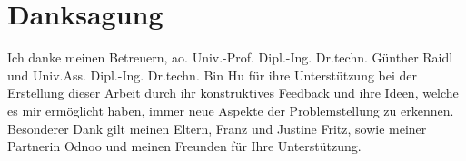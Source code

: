 \chapter*{Danksagung}

Ich danke meinen Betreuern, ao. Univ.-Prof. Dipl.-Ing. Dr.techn. Günther Raidl und Univ.Ass. Dipl.-Ing. Dr.techn. Bin Hu für ihre Unterstützung bei der Erstellung dieser Arbeit durch ihr konstruktives Feedback und ihre Ideen, welche es mir ermöglicht haben, immer neue Aspekte der Problemstellung zu erkennen.\\

Besonderer Dank gilt meinen Eltern, Franz und Justine Fritz, sowie meiner Partnerin Odnoo und meinen Freunden für Ihre Unterstützung.